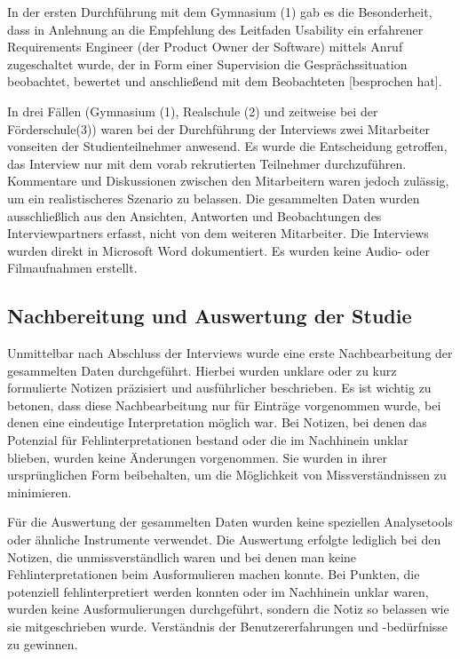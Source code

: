 In der ersten Durchführung mit dem Gymnasium (1) gab es die Besonderheit, dass  in Anlehnung an die Empfehlung des Leitfaden Usability ein erfahrener Requirements Engineer (der Product Owner der Software) mittels Anruf zugeschaltet wurde, der \glqq in Form einer Supervision die Gesprächssituation beobachtet, bewertet und anschließend mit dem Beobachteten [besprochen hat]\grqq{}\cite{dakks}.

In drei Fällen (Gymnasium (1), Realschule (2) und zeitweise bei der Förderschule(3)) waren bei der Durchführung der Interviews zwei Mitarbeiter vonseiten der Studienteilnehmer anwesend. Es wurde die Entscheidung getroffen, das Interview nur mit dem vorab rekrutierten Teilnehmer durchzuführen. Kommentare und Diskussionen zwischen den Mitarbeitern waren jedoch zulässig, um ein realistischeres Szenario zu belassen. Die gesammelten Daten wurden ausschließlich aus den Ansichten, Antworten und Beobachtungen des Interviewpartners erfasst, nicht von dem weiteren Mitarbeiter. Die Interviews wurden direkt in Microsoft Word dokumentiert. Es wurden keine Audio- oder Filmaufnahmen erstellt.

\subsection{Nachbereitung und Auswertung der Studie}

Unmittelbar nach Abschluss der Interviews wurde eine erste Nachbearbeitung der gesammelten Daten durchgeführt. Hierbei wurden unklare oder zu kurz formulierte Notizen präzisiert und ausführlicher beschrieben. Es ist wichtig zu betonen, dass diese Nachbearbeitung nur für Einträge vorgenommen wurde, bei denen eine eindeutige Interpretation möglich war. Bei Notizen, bei denen das Potenzial für Fehlinterpretationen bestand oder die im Nachhinein unklar blieben, wurden keine Änderungen vorgenommen. Sie wurden in ihrer ursprünglichen Form beibehalten, um die Möglichkeit von Missverständnissen zu minimieren.

Für die Auswertung der gesammelten Daten wurden keine speziellen Analysetools oder ähnliche Instrumente verwendet. Die Auswertung erfolgte lediglich bei den Notizen, die unmissverständlich waren und bei denen man keine Fehlinterpretationen beim Ausformulieren machen konnte. Bei Punkten, die potenziell fehlinterpretiert werden konnten oder im Nachhinein unklar waren, wurden keine Ausformulierungen durchgeführt, sondern die Notiz so belassen wie sie mitgeschrieben wurde. Verständnis der Benutzererfahrungen und -bedürfnisse zu gewinnen.


